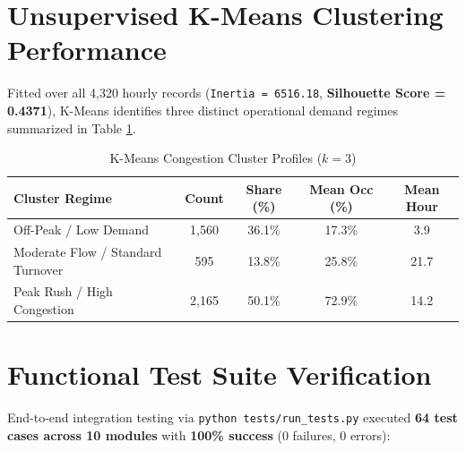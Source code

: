 \documentclass[12pt,a4paper,oneside]{report}
\begin{document}
\section{Unsupervised K-Means Clustering Performance}
Fitted over all 4,320 hourly records (\texttt{Inertia = 6516.18}, \textbf{Silhouette Score = 0.4371}), K-Means identifies three distinct operational demand regimes summarized in Table \ref{tab:kmeans_profiles}.

\begin{table}[H]
\centering
\caption{K-Means Congestion Cluster Profiles ($k = 3$)}
\label{tab:kmeans_profiles}
\begin{tabular}{lcccc}
\toprule
\textbf{Cluster Regime} & \textbf{Count} & \textbf{Share (\%)} & \textbf{Mean Occ (\%)} & \textbf{Mean Hour} \\
\midrule
Off-Peak / Low Demand & 1,560 & 36.1\% & 17.3\% & 3.9 \\
Moderate Flow / Standard Turnover & 595 & 13.8\% & 25.8\% & 21.7 \\
Peak Rush / High Congestion & 2,165 & 50.1\% & 72.9\% & 14.2 \\
\bottomrule
\end{tabular}
\end{table}

\section{Functional Test Suite Verification}
End-to-end integration testing via \texttt{python tests/run\_tests.py} executed \textbf{64 test cases across 10 modules} with \textbf{100\% success} (0 failures, 0 errors):
\end{document}
